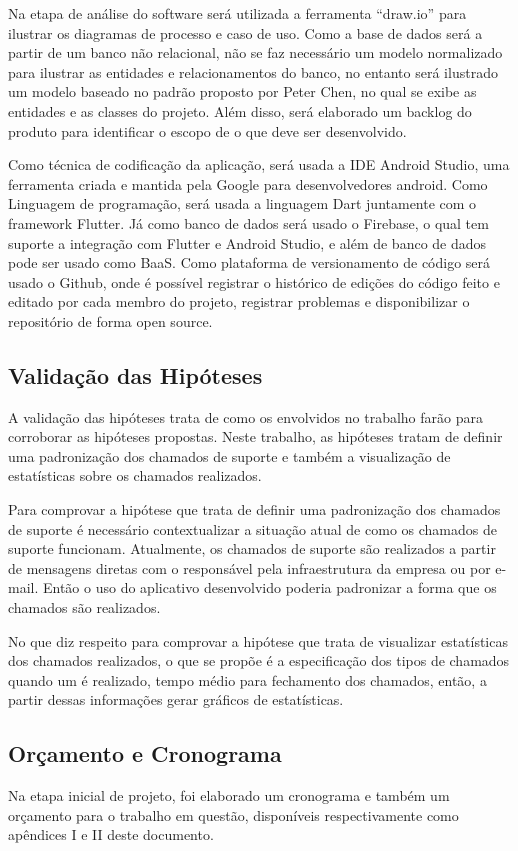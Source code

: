 Na etapa de análise do software será utilizada a ferramenta “draw.io” para ilustrar os diagramas de processo e caso de uso. Como a base de dados será a partir de um banco não relacional, não se faz necessário um modelo normalizado para ilustrar as entidades e relacionamentos do banco, no entanto será ilustrado um modelo baseado no padrão proposto por Peter Chen, no qual se exibe as entidades e as classes do projeto. Além disso, será elaborado um backlog do produto para identificar o escopo de o que deve ser desenvolvido.  

Como técnica de codificação da aplicação, será usada a IDE Android Studio, uma ferramenta criada e mantida pela Google para desenvolvedores android. Como Linguagem de programação, será usada a linguagem Dart juntamente com o framework Flutter. Já como banco de dados será usado o Firebase, o qual tem suporte a integração com Flutter e Android Studio, e além de banco de dados pode ser usado como BaaS. Como plataforma de versionamento de código será usado o Github, onde é possível registrar o histórico de edições do código feito e editado por cada membro do projeto, registrar problemas e disponibilizar o repositório de forma open source.

\subsection{Validação das Hipóteses}
A validação das hipóteses trata de como os envolvidos no trabalho farão para corroborar as hipóteses propostas. Neste  trabalho, as hipóteses tratam de definir uma padronização dos chamados de suporte e também a visualização de estatísticas sobre os chamados realizados.

Para comprovar a hipótese que trata de definir uma padronização dos chamados de suporte é necessário contextualizar a situação atual de como os chamados de suporte funcionam. Atualmente, os chamados de suporte são realizados a partir de mensagens diretas com o responsável pela infraestrutura da empresa ou por e-mail. Então o uso do aplicativo desenvolvido poderia padronizar a forma que os chamados são realizados.

No que diz respeito para comprovar a hipótese que trata de visualizar estatísticas dos chamados realizados, o que se propõe é a especificação dos tipos de chamados quando um é realizado, tempo médio para fechamento dos chamados, então, a partir dessas informações gerar gráficos de estatísticas.
  
 \subsection{Orçamento e Cronograma}  
Na etapa inicial de projeto, foi elaborado um cronograma e também um orçamento para o trabalho em questão, disponíveis respectivamente como apêndices I e II deste documento. 
